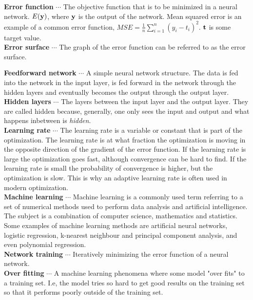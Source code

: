 \documentclass[11pt, letterpaper]{amsart}
\begin{document}
\noindent
\textbf{Error function }$\cdots$ The objective function that is to be minimized in a neural network. $E(\bold{y})$, where $\bold{y}$ is the output of the network. Mean squared error is an example of a common error function, $MSE = \frac{1}{n} \sum_{i=1}^n (y_i - t_i)^2$. $\bold{t}$ is some target value.
\\

\noindent
\textbf{Error surface }$\cdots$ The graph of the error function can be referred to as the error surface.
\newpage

\noindent
\textbf{Feedforward network} $\cdots$ A simple neural network structure. The data is fed into the network in the input layer, is fed forward in the network through the hidden layers and eventually becomes the output through the output layer.
\\

\noindent
\textbf{Hidden layers} $\cdots$ The layers between the input layer and the output layer. They are called hidden because, generally, one only sees the input and output and what happens inbetween is \textit{hidden}.
\\

\noindent
\textbf{Learning rate} $\cdots$ The learning rate is a variable or constant that is part of the optimization. The learning rate is at what fraction the optimization is moving in the opposite direction of the gradient of the error function. If the learning rate is large the optimization goes fast, although convergence can be hard to find. If the learning rate is small the probability of convergence is higher, but the optimization is slow. This is why an adaptive learning rate is often used in modern optimization.
\\


\noindent
\textbf{Machine learning} $\cdots$ Machine learning is a commonly used term referring to a set of numerical methods used to perform data analysis and artificial intelligence. The subject is a combination of computer science, mathematics and statistics. Some examples of machine learning methods are artificial neural networks, logistic regression, k-nearest neighbour and principal component analysis, and even polynomial regression.
\\

\noindent
\textbf{Network training} $\cdots$ Iteratively minimizing the error function of a neural network.
\\

\noindent
\textbf{Over fitting} $\cdots$ A machine learning phenomena where some model "over fits" to a training set. I.e, the model tries so hard to get good results on the training set so that it performs poorly outside of the training set. 
\\
\end{document}
